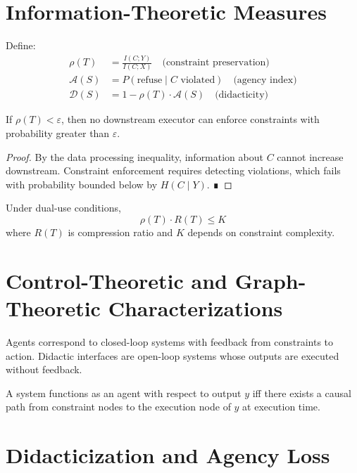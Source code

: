 \section{Information-Theoretic Measures}

Define:
\begin{align*}
\rho(T) &= \frac{I(C;Y)}{I(C;X)} \quad \text{(constraint preservation)} \\
\mathcal{A}(S) &= P(\text{refuse} \mid C \text{ violated}) \quad \text{(agency index)} \\
\mathcal{D}(S) &= 1 - \rho(T)\cdot \mathcal{A}(S) \quad \text{(didacticity)}
\end{align*}

\begin{theorem}
If $\rho(T) < \varepsilon$, then no downstream executor can enforce constraints with probability greater than $\varepsilon$.
\end{theorem}

\begin{proof}
By the data processing inequality, information about $C$ cannot increase downstream. Constraint enforcement requires detecting violations, which fails with probability bounded below by $H(C\mid Y)$. ∎
\end{proof}

\begin{theorem}
Under dual-use conditions,
\[
\rho(T)\cdot R(T) \le K
\]
where $R(T)$ is compression ratio and $K$ depends on constraint complexity.
\end{theorem}

\section{Control-Theoretic and Graph-Theoretic Characterizations}

Agents correspond to closed-loop systems with feedback from constraints to action. Didactic interfaces are open-loop systems whose outputs are executed without feedback.

\begin{theorem}
A system functions as an agent with respect to output $y$ iff there exists a causal path from constraint nodes to the execution node of $y$ at execution time.
\end{theorem}

\section{Didacticization and Agency Loss}


